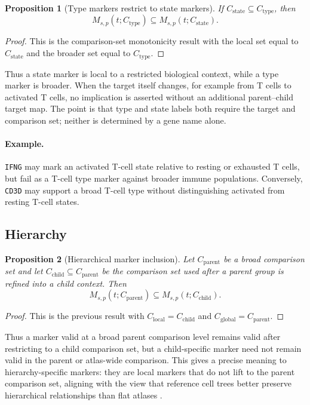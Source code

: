 \documentclass{article}
\newtheorem{proposition}{Proposition}
\begin{document}
\begin{proposition}[Type markers restrict to state markers]\label{prop:type-state-scope-inclusion}
If $C_{\mathrm{state}}\subseteq C_{\mathrm{type}}$, then
\[
  M_{s,p}(t;C_{\mathrm{type}})
  \subseteq
  M_{s,p}(t;C_{\mathrm{state}}).
\]
\end{proposition}

\begin{proof}
This is the comparison-set monotonicity result with the local set equal to $C_{\mathrm{state}}$ and the broader set equal to $C_{\mathrm{type}}$.
\end{proof}

Thus a state marker is local to a restricted biological context, while a type marker is broader. When the target itself changes, for example from T cells to activated T cells, no implication is asserted without an additional parent--child target map. The point is that type and state labels both require the target and comparison set; neither is determined by a gene name alone.

\paragraph{Example.}
\texttt{IFNG} may mark an activated T-cell state relative to resting or exhausted T cells, but fail as a T-cell type marker against broader immune populations. Conversely, \texttt{CD3D} may support a broad T-cell type without distinguishing activated from resting T-cell states.

\subsection{Hierarchy}

\begin{proposition}[Hierarchical marker inclusion]\label{prop:hierarchical-marker-inclusion}
Let $C_{\mathrm{parent}}$ be a broad comparison set and let $C_{\mathrm{child}}\subseteq C_{\mathrm{parent}}$ be the comparison set used after a parent group is refined into a child context. Then
\[
  M_{s,p}(t;C_{\mathrm{parent}})
  \subseteq
  M_{s,p}(t;C_{\mathrm{child}}).
\]
\end{proposition}

\begin{proof}
This is the previous result with $C_{\mathrm{local}}=C_{\mathrm{child}}$ and $C_{\mathrm{global}}=C_{\mathrm{parent}}$.
\end{proof}

Thus a marker valid at a broad parent comparison level remains valid after restricting to a child comparison set, but a child-specific marker need not remain valid in the parent or atlas-wide comparison. This gives a precise meaning to hierarchy-specific markers: they are local markers that do not lift to the parent comparison set, aligning with the view that reference cell trees better preserve hierarchical relationships than flat atlases \citep{Domcke2023ReferenceCellTree}.
\end{document}
